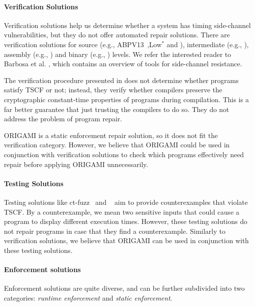 {\paragraph*{Verification Solutions}
Verification solutions help us determine whether a system has timing side-channel vulnerabilities, but they do not offer automated repair solutions. There are verification solutions for source (e.g., ABPV13~\cite{ABPV13},Low$^*$\cite{LowStar} and \cite{7958606}), intermediate  (e.g., \cite{usenix_ctp_verification,FlowTracker}), assembly (e.g., \cite{Jasmin, Vale}) and binary (e.g., \cite{CacheAudit,KMO12}) levels. We refer the interested reader to Barbosa et al. \cite[\S IV]{timing-channel-survey}, which contains an overview of tools for side-channel resistance. 

The verification procedure presented in \cite{SecureCompilation} does not determine whether programs satisfy TSCF or not; instead, they verify whether compilers preserve the cryptographic constant-time properties of programs during compilation. This is a far better guarantee that just trusting the compilers to do so. They do not address the problem of program repair.

ORIGAMI is a static enforcement repair solution, so it does not fit the verification category. However, we believe that ORIGAMI could be used in conjunction with verification solutions to check which programs effectively need repair before applying ORIGAMI unnecessarily. 

\paragraph*{Testing Solutions}
Testing solutions like ct-fuzz~\cite{ct-fuzz} and ~\cite{stvr.1718} aim to provide counterexamples that violate TSCF. By a counterexample, we mean two sensitive inputs that could cause a program to display different execution times. However, these testing solutions do not repair programs in case that they find a counterexample. Similarly to verification solutions, we believe that ORIGAMI can be used in conjunction with these testing solutions.%

\paragraph*{Enforcement solutions}
Enforcement solutions are quite diverse, and can be further subdivided into two categories: \emph{runtime enforcement}  and \emph{static enforcement}. 

}
